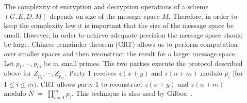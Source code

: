 The complexity of encryption and decryption operations of a scheme
$(G,E,D,M)$ depends on size of the message space $M$. Therefore, in
order to keep the complexity low it is important that the size of the
message space be small. However, in order to achieve adequate
precision the message space should be large. Chinese remainder theorem
(CRT) allows us to perform computation over smaller spaces and then
reconstruct the result for a larger message space. Let
$p_1,\cdots,p_m$ be $m$ small primes.  The two parties execute the
protocol described above for $Z_{p_1}, \cdots, Z_{p_m}$. Party $1$
receives $z (x+y)$ and $z (n+m)$ modulo $p_i$ (for $1 \leq i \leq
m)$. CRT allows party $1$ to reconstruct $z (x+y)$ and $z (n+m)$
modulo $N \; = \; \prod_{i=1}^m p_i$. This technique is also used by
Gilboa~\cite{Gilboa99}.

